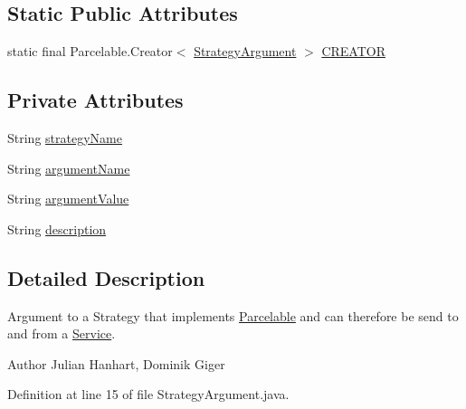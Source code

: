 \subsection*{Static Public Attributes}
\begin{DoxyCompactItemize}
\item 
static final Parcelable.Creator$<$ \hyperlink{classch_1_1zhaw_1_1ba10__bsha__1_1_1StrategyArgument}{StrategyArgument} $>$ \hyperlink{classch_1_1zhaw_1_1ba10__bsha__1_1_1StrategyArgument_a6f093e36dac1d9e9a4f9f7e238438566}{CREATOR}
\end{DoxyCompactItemize}
\subsection*{Private Attributes}
\begin{DoxyCompactItemize}
\item 
String \hyperlink{classch_1_1zhaw_1_1ba10__bsha__1_1_1StrategyArgument_a8253c7846314fd6c03d51eb7dbe12af1}{strategyName}
\item 
String \hyperlink{classch_1_1zhaw_1_1ba10__bsha__1_1_1StrategyArgument_a23bc0d9bfc4863330365b5d5acf3bb75}{argumentName}
\item 
String \hyperlink{classch_1_1zhaw_1_1ba10__bsha__1_1_1StrategyArgument_aaa81438d1961c79ddfa16915aa9cf5ff}{argumentValue}
\item 
String \hyperlink{classch_1_1zhaw_1_1ba10__bsha__1_1_1StrategyArgument_ac73a5de1e59e47ee8dde08e59b5dfa66}{description}
\end{DoxyCompactItemize}


\subsection{Detailed Description}
Argument to a Strategy that implements \hyperlink{}{Parcelable} and can therefore be send to and from a \hyperlink{}{Service}.

\begin{DoxyAuthor}{Author}
Julian Hanhart, Dominik Giger 
\end{DoxyAuthor}


Definition at line 15 of file StrategyArgument.java.

